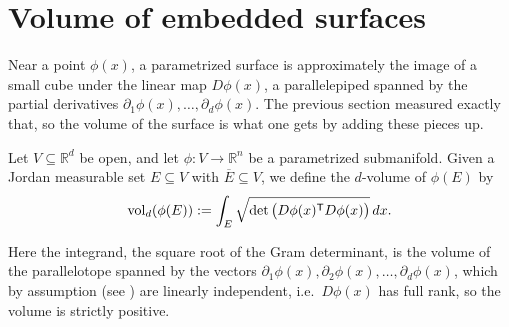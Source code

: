 
\section{Volume of embedded surfaces}
\label{sec:volume_embedded_surfaces}

Near a point $\phi(x)$, a parametrized surface is approximately the image of a small cube under
the linear map $D\phi(x)$, a parallelepiped spanned by the partial derivatives
$\partial_1\phi(x),\dots,\partial_d\phi(x)$. The previous section measured exactly that, so the
volume of the surface is what one gets by adding these pieces up.

\begin{definition}
\label{def:d_volume_parametrized_submanifold}
Let $V \subseteq \mathbb{R}^d$ be open, and let $\phi : V \to \mathbb{R}^n$ be a parametrized
submanifold. Given a Jordan measurable set $E \subseteq V$ with $\overline E \subseteq V$,
we define the $d$-volume of $\phi(E)$ by
\[\operatorname{vol}_d(\phi(E)) := \int_E \sqrt{\det\big(D\phi(x)^{\mathsf{T}} D\phi(x)\big)}\,dx.\]
\end{definition}

Here the integrand, the square root of the Gram determinant, is the volume of the parallelotope
spanned by the vectors $\partial_1\phi(x),\partial_2\phi(x),\dots,\partial_d\phi(x)$, which by
assumption
(see ) are linearly independent, i.e.\ $D\phi(x)$ has full rank,
so the volume is strictly positive.

